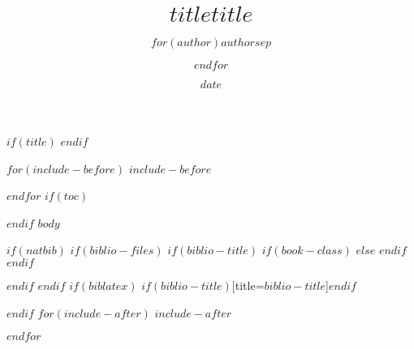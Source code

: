 \documentclass[$if(fontsize)$$fontsize$,$endif$$if(handout)$handout,$endif$$if(beamer)$ignorenonframetext,$endif$]{$documentclass$}
\title[$shorttitle$]{$title$}
\title{$title$}
\author{$for(author)$$author$$sep$ \and $endfor$}
\date{$date$}
\institute[统计之都]{
统计之都\\
\hurl{http://cos.name}
}
\begin{document}
$if(title)$
\frame{\titlepage}
$endif$
 
$for(include-before)$
$include-before$
 
$endfor$
$if(toc)$
\begin{frame}
\tableofcontents[hideallsubsections]
\end{frame}
 
$endif$
$body$
 
$if(natbib)$
$if(biblio-files)$
$if(biblio-title)$
$if(book-class)$
\renewcommand\bibname{$biblio-title$}
$else$
\renewcommand\refname{$biblio-title$}
$endif$
$endif$

 
$endif$
$endif$
$if(biblatex)$
\printbibliography$if(biblio-title)$[title=$biblio-title$]$endif$
 
$endif$
$for(include-after)$
$include-after$
 
$endfor$
\end{document}
